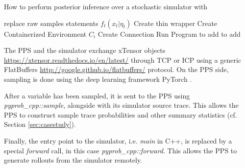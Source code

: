 \documentclass{article}
\begin{document}
  \begin{algorithm}
   \caption{How to perform posterior inference over a stochastic simulator with 
   }
    \begin{algorithmic}[1]
      \Comment{}

        \State replace raw samples statements $f_{t}(x_{t} | \eta_{t}) $
        \State Create thin wrapper
        \State Create Containerized Environment $C_{i}$
        \State Create Connection
        \State Run Program
       \EndFunction
       \State to add
       \EndFunction
       \State to add
       \EndFunction


\end{algorithmic}
\end{algorithm}





The PPS and the simulator exchange xTensor objects \url{https://xtensor.readthedocs.io/en/latest/} through TCP or ICP using a generic FlatBuffers \url{http://google.github.io/flatbuffers/} protocol. On the PPS side, sampling is done using the deep learning framework PyTorch \cite{paszke2017automatic}.

After a variable has been sampled, it is sent to the PPS using \textit{pyprob\_cpp::sample}, alongside with its simulator source trace. This allows the PPS to construct sample trace probabilities and other summary statistics (cf. Section \ref{sec:casestudy}). 

Finally, the entry point to the simulator, i.e. \textit{main} in C++, is replaced by a special \textit{forward} call, in this case \textit{pyprob\_cpp::forward}.
This allows the PPS to generate rollouts from the simulator remotely. 
\end{document}
